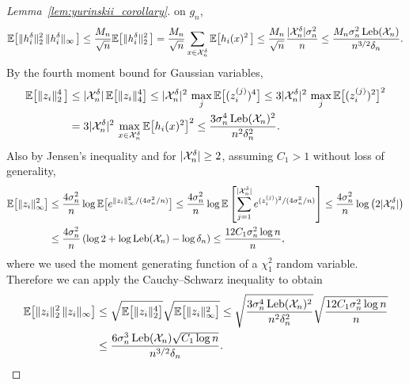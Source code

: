 \begin{proof}[Lemma~\ref{lem:yurinskii_corollary}]
  on $g_n$,
  \begin{align*}
    \mathbb{E}\big[\|h_i^\delta\|_2^2 \,
      \|h_i^\delta\|_\infty \,
      \big]
    \leq
    \frac{M_n}{\sqrt n}
    \mathbb{E}\big[\|h_i^\delta\|_2^2 \,
      \big]
    =
    \frac{M_n}{\sqrt n}
    \sum_{x \in \mathcal{X}_n^\delta}
    \mathbb{E}\big[h_i(x)^2 \,
      \big]
    \leq
    \frac{M_n}{\sqrt n}
    \frac{|\mathcal{X}_n^\delta| \sigma_n^2}{n}
    \leq
    \frac{M_n \sigma_n^2 \operatorname{Leb}(\mathcal{X}_n)}{n^{3/2}\delta_n}.
  \end{align*}
  By the fourth moment bound for Gaussian variables,
  \begin{align*}
    \mathbb{E}\big[
      \|z_i\|_2^4 \,
      \big]
    &\leq
    |\mathcal{X}_n^\delta| \,
    \mathbb{E}\big[
      \|z_i\|_4^4
      \big]
    \leq
    |\mathcal{X}_n^\delta|^2 \,
    \max_j
    \mathbb{E}\big[
    (z_i^{(j)})^4
    \big]
    \leq
    3
    |\mathcal{X}_n^\delta|^2 \,
    \max_j
    \mathbb{E}\big[
    (z_i^{(j)})^2
    \big]^2 \\
    &=
    3
    |\mathcal{X}_n^\delta|^2 \,
    \max_{x \in \mathcal{X}_n^\delta}
    \mathbb{E}\big[
      h_i(x)^2
      \big]^2
    \leq
    \frac{3\sigma_n^4 \operatorname{Leb}(\mathcal{X}_n)^2}{n^2\delta_n^2} .
  \end{align*}
  Also by Jensen's inequality
  and for $|\mathcal{X}_n^\delta| \geq 2$,
  assuming $C_1 > 1$ without loss of generality,
  \begin{align*}
    \mathbb{E}\big[
      \|z_i\|_\infty^2
      \big]
    &\leq
    \frac{4 \sigma_n^2}{n}
    \log
    \mathbb{E}\big[
      e^{\|z_i\|_\infty^2 / (4\sigma_n^2/n)}
      \big]
    \leq
    \frac{4 \sigma_n^2}{n}
    \log
    \mathbb{E}\left[
      \sum_{j=1}^{|\mathcal{X}_n^\delta|}
      e^{(z_i^{(j)})^2 / (4\sigma_n^2/n)}
    \right]
    \leq
    \frac{4\sigma_n^2}{n}
    \log \big(2|\mathcal{X}_n^\delta|\big) \\
    &\leq
    \frac{4\sigma_n^2}{n}
    \left(
      \log 2 + \log \operatorname{Leb}(\mathcal{X}_n) - \log \delta_n
    \right)
    \leq
    \frac{12 C_1 \sigma_n^2 \log n}{n},
  \end{align*}
  where we used the moment
  generating function of a $\chi_1^2$ random variable.
  Therefore we can apply the Cauchy--Schwarz inequality
  to obtain
  \begin{align*}
    \E\big[\|z_i\|_2^2 \,
      \|z_i\|_\infty
      \big]
    &\leq
    \sqrt{
      \E\big[\|z_i\|_2^4
        \big]}
    \sqrt{
      \E\big[
        \|z_i\|_\infty^2
        \big]}
    \leq
    \sqrt{
      \frac{3\sigma_n^4 \Leb(\cX_n)^2}{n^2\delta_n^2}}
    \sqrt{ \frac{12 C_1 \sigma_n^2 \log n}{n} } \\
    &\leq
    \frac{6\sigma_n^3
      \Leb(\cX_n)
      \sqrt{C_1 \log n}}{n^{3/2} \delta_n}.

\end{align*}
\end{proof}

